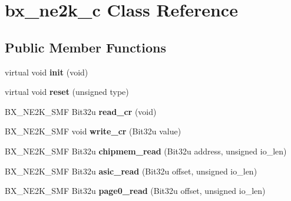 \hypertarget{classbx__ne2k__c}{\section{bx\-\_\-ne2k\-\_\-c Class Reference}
\label{classbx__ne2k__c}
}
\subsection*{Public Member Functions}
\begin{DoxyCompactItemize}
\item 
\hypertarget{classbx__ne2k__c_ae7dce10cbb81edb33cd4079159432732}{virtual void {\bfseries init} (void)}\label{classbx__ne2k__c_ae7dce10cbb81edb33cd4079159432732}

\item 
\hypertarget{classbx__ne2k__c_a304c7130e8fdb026351c4b57e11cb70d}{virtual void {\bfseries reset} (unsigned type)}\label{classbx__ne2k__c_a304c7130e8fdb026351c4b57e11cb70d}

\item 
\hypertarget{classbx__ne2k__c_a369a3b1b0ee2d349c7e19a565a0b1b2b}{B\-X\-\_\-\-N\-E2\-K\-\_\-\-S\-M\-F Bit32u {\bfseries read\-\_\-cr} (void)}\label{classbx__ne2k__c_a369a3b1b0ee2d349c7e19a565a0b1b2b}

\item 
\hypertarget{classbx__ne2k__c_a00b04f4ca72d07587393521b1e8b23c6}{B\-X\-\_\-\-N\-E2\-K\-\_\-\-S\-M\-F void {\bfseries write\-\_\-cr} (Bit32u value)}\label{classbx__ne2k__c_a00b04f4ca72d07587393521b1e8b23c6}

\item 
\hypertarget{classbx__ne2k__c_a54933d27a5dcc2812e966b483d4eac88}{B\-X\-\_\-\-N\-E2\-K\-\_\-\-S\-M\-F Bit32u {\bfseries chipmem\-\_\-read} (Bit32u address, unsigned io\-\_\-len)}\label{classbx__ne2k__c_a54933d27a5dcc2812e966b483d4eac88}

\item 
\hypertarget{classbx__ne2k__c_a40a8406ca2769e994100fa756c2f93d6}{B\-X\-\_\-\-N\-E2\-K\-\_\-\-S\-M\-F Bit32u {\bfseries asic\-\_\-read} (Bit32u offset, unsigned io\-\_\-len)}\label{classbx__ne2k__c_a40a8406ca2769e994100fa756c2f93d6}

\item 
\hypertarget{classbx__ne2k__c_a27b4f6d9ea2ee6c205eb829ba44296f9}{B\-X\-\_\-\-N\-E2\-K\-\_\-\-S\-M\-F Bit32u {\bfseries page0\-\_\-read} (Bit32u offset, unsigned io\-\_\-len)}\label{classbx__ne2k__c_a27b4f6d9ea2ee6c205eb829ba44296f9}


\end{DoxyCompactItemize}

